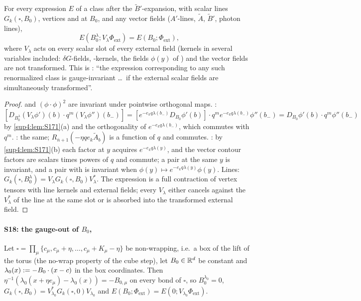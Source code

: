 \begin{lemma}\label{sup4:lem:S172}
For every expression $E$ of a class after the $\tilde B'$-expansion, with scalar lines $G_k(\square,B_0)$, vertices \cite[(1.6)--(1.11)]{Ba3} and \cite[(1.13)--(1.15)]{Ba3} at $B_0$, and any vector fields ($A'$-lines, $\tilde A$, $\tilde B'$, photon lines),
\[
E(B_0^\lambda;V_\lambda\Phi_{\mathrm{ext}})=E(B_0;\Phi_{\mathrm{ext}}),
\]
where $V_\lambda$ acts on every scalar slot of every external field (kernels in several variables included: $\delta G$-fields, \cite[(1.16)]{Ba3}-kernels, the fields $\phi(y)$ of \cite[(1.12)]{Ba3}) and the vector fields are not transformed. This is \cite[p.~433]{Ba3}: ``the expression corresponding to any such renormalized class is gauge-invariant \dots\ if the external scalar fields are simultaneously transformed''.
\end{lemma}

\begin{proof}
\cite[(1.6), (1.7)]{Ba3} and $(\phi\cdot\phi)^2$ are invariant under pointwise orthogonal maps. \cite[(1.8)]{Ba3}: $[D_{B_0^\lambda}(V_\lambda\phi')(b)\cdot q^m(V_\lambda\phi'')(b_-)]=[e^{-e_kq\lambda(b_-)}D_{B_0}\phi'(b)]\cdot q^me^{-e_kq\lambda(b_-)}\phi''(b_-)=D_{B_0}\phi'(b)\cdot q^m\phi''(b_-)$ by \cref{sup4:lem:S171}(a) and the orthogonality of $e^{-e_kq\lambda(b_-)}$, which commutes with $q^m$. \cite[(1.9)--(1.11)]{Ba3}: the same; $R_{\bar n+1}(-\eta qe_k\tilde A_b)$ is a function of $q$ and commutes. \cite[(1.13)--(1.15)]{Ba3}: by \cref{sup4:lem:S171}(b) each factor at $y$ acquires $e^{-e_kq\lambda(y)}$, and the vector contour factors are scalars times powers of $q$ and commute; a pair at the same $y$ is invariant, and a pair with \cite[(1.12)]{Ba3} is invariant when $\phi(y)\mapsto e^{-e_kq\lambda(y)}\phi(y)$. Lines: $G_k(\square,B_0^\lambda)=V_\lambda G_k(\square,B_0)V_\lambda^*$. The expression is a full contraction of vertex tensors with line kernels and external fields; every $V_\lambda$ either cancels against the $V_\lambda^*$ of the line at the same slot or is absorbed into the transformed external field.
\end{proof}

\paragraph*{S18: the gauge-out of $B_0$, \cite[p.~433]{Ba3}}

\begin{lemma}\label{sup4:lem:S18}
Let $\square=\prod_\mu\{c_\mu,c_\mu+\eta,\dots,c_\mu+K_\mu-\eta\}$ be non-wrapping, i.e.\ a box of the lift of the torus (the no-wrap property of the cube step), let $B_0\in\mathbb R^d$ be constant and $\lambda_0(x):=-B_0\cdot(x-c)$ in the box coordinates. Then $\eta^{-1}(\lambda_0(x+\eta e_\mu)-\lambda_0(x))=-B_{0,\mu}$ on every bond of $\square$, so $B_0^{\lambda_0}=0$, $G_k(\square,B_0)=V_{\lambda_0}^*G_k(\square,0)V_{\lambda_0}$ and $E(B_0;\Phi_{\mathrm{ext}})=E(0;V_{\lambda_0}\Phi_{\mathrm{ext}})$.
\end{lemma}

